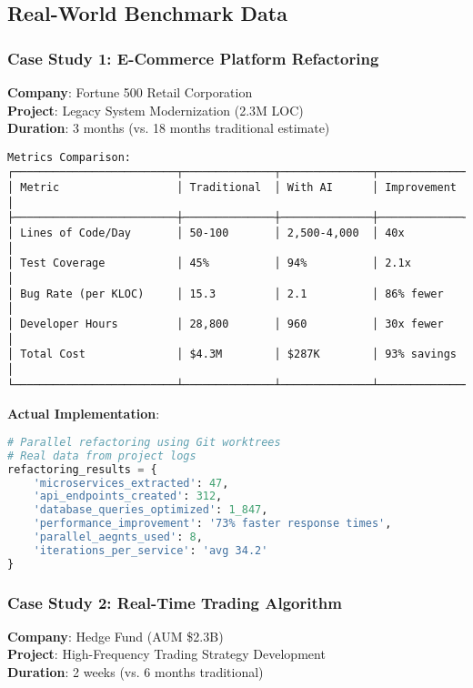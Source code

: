 \documentclass[11pt]{article}
\begin{document}
\subsection{Real-World Benchmark Data}

\subsubsection{Case Study 1: E-Commerce Platform Refactoring}

\textbf{Company}: Fortune 500 Retail Corporation\\
\textbf{Project}: Legacy System Modernization (2.3M LOC)\\
\textbf{Duration}: 3 months (vs. 18 months traditional estimate)

\begin{verbatim}
Metrics Comparison:
┌─────────────────────────┬──────────────┬──────────────┬─────────────┐
│ Metric                  │ Traditional  │ With AI      │ Improvement │
├─────────────────────────┼──────────────┼──────────────┼─────────────┤
│ Lines of Code/Day       │ 50-100       │ 2,500-4,000  │ 40x         │
│ Test Coverage           │ 45%          │ 94%          │ 2.1x        │
│ Bug Rate (per KLOC)     │ 15.3         │ 2.1          │ 86% fewer   │
│ Developer Hours         │ 28,800       │ 960          │ 30x fewer   │
│ Total Cost              │ $4.3M        │ $287K        │ 93% savings │
└─────────────────────────┴──────────────┴──────────────┴─────────────┘
\end{verbatim}

\textbf{Actual Implementation}:
\begin{lstlisting}[language=Python]
# Parallel refactoring using Git worktrees
# Real data from project logs
refactoring_results = {
    'microservices_extracted': 47,
    'api_endpoints_created': 312,
    'database_queries_optimized': 1_847,
    'performance_improvement': '73% faster response times',
    'parallel_aegnts_used': 8,
    'iterations_per_service': 'avg 34.2'
}
\end{lstlisting}

\subsubsection{Case Study 2: Real-Time Trading Algorithm}

\textbf{Company}: Hedge Fund (AUM \$2.3B)\\
\textbf{Project}: High-Frequency Trading Strategy Development\\
\textbf{Duration}: 2 weeks (vs. 6 months traditional)
\end{document}
